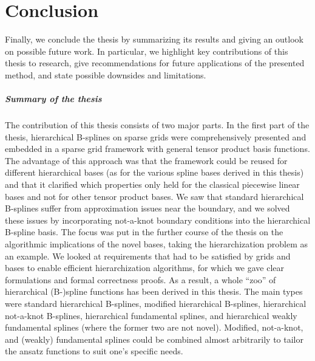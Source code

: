 \chapter{Conclusion}
\label{chap:90conclusion}

\noindent
Finally, we conclude the thesis by summarizing its results
and giving an outlook on possible future work.
In particular, we highlight key contributions of this thesis to research,
give recommendations for future applications of the presented method, and
state possible downsides and limitations.

\vspace*{-0.5em}

\paragraph{Summary of the thesis}

The contribution of this thesis consists of two major parts.
In the first part of the thesis,
hierarchical B-splines on sparse grids were comprehensively presented
and embedded in a sparse grid framework with general
tensor product basis functions.
The advantage of this approach was that the framework could be reused
for different hierarchical bases
(as for the various spline bases derived in this thesis)
and that it clarified which properties only held for the
classical piecewise linear bases and not for other tensor product bases.
We saw that standard hierarchical B-splines suffer from
approximation issues near the boundary, and
we solved these issues by incorporating not-a-knot boundary conditions
into the hierarchical B-spline basis.
The focus was put in the further course of the thesis
on the algorithmic implications of the novel bases,
taking the hierarchization problem as an example.
We looked at requirements that had to be satisfied by grids and bases
to enable efficient hierarchization algorithms,
for which we gave clear formulations and formal correctness proofs.
As a result, a whole ``zoo'' of hierarchical (B-)spline functions
has been derived in this thesis.
The main types were
standard hierarchical B-splines,
modified hierarchical B-splines,
hierarchical not-a-knot B-splines,
hierarchical fundamental splines, and
hierarchical weakly fundamental splines
(where the former two are not novel).
Modified, not-a-knot, and (weakly) fundamental splines could be combined
almost arbitrarily to tailor the ansatz functions to suit one's specific needs.


